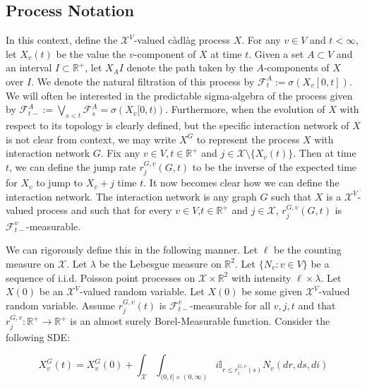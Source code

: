 \documentclass[12pt]{article}
\newcommand{\mb}{\mathbb}
\newcommand{\mc}{\mathcal}
\newcommand{\ra}{\rightarrow}
\newcommand{\ov}{\overline}
\newcommand{\ind}{\hspace{24pt}}
\newcommand{\defeq}{:=}								%
\newcommand{\sta}{\mc{X}}							%
\newcommand{\cl}[1]{\ov{#1}}						%
\newcommand{\Xf}{X}									%
\newcommand{\poiss}{N}								%
\newcommand{\leb}{\lambda}							%
\newcommand{\Sm}{\ell}								%
\newcommand{\rate}{r}								%
\newcommand{\F}{\mc{F}}								%
\newcommand{\poissv}[1]{_{#1}}						%
\newcommand{\vind}[1]{_{#1}}						%
\newcommand{\tme}[1]{(#1)}							%
\newcommand{\tmi}[1]{#1}							%
\newcommand{\gind}[1]{^{#1}}						%
\newcommand{\vpara}[1]{^{#1}}						%
\newcommand{\stpara}[1]{_{#1}}						%
\newcommand{\tpara}[1]{_{#1}}						%
\newcommand{\gvpara}[2]{^{#1,#2}}					%
\begin{document}
\subsection{Process Notation}
\label{p::not}

In this context, define the \(\sta^V\)-valued c\`adl\`ag process \(\Xf\). For any \(v \in V\) and \(t < \infty\), let \(\Xf\vind{v}\tme{t}\) be the value the \(v\)-component of \(\Xf\) at time \(t\). Given a set \(A\subset V\) and an interval \(I \subset \mb{R}^+\), let \(\Xf\vind{A}\tmi{I}\) denote the path taken by the \(A\)-components of \(\Xf\) over \(\tmi{I}\). We denote the natural filtration of this process by \(\F\vpara{A}\tpara{t} \defeq \sigma \left(\Xf\vind{v}\tmi{[0,t]}\right)\). We will often be interested in the predictable sigma-algebra of the process given by \(\F\vpara{A}\tpara{t-} \defeq \bigvee_{s < t} \F\vpara{A}\tpara{s} = \sigma\left(\Xf\vind{v}\tmi{[0,t)}\right)\). Furthermore, when the evolution of \(\Xf\) with respect to its topology is clearly defined, but the specific interaction network of \(\Xf\) is not clear from context, we may write \(\Xf\gind{G}\) to represent the process \(\Xf\) with interaction network \(G\). Fix any \(v \in V,t \in \mb{R}^+\) and \(j \in \sta\setminus\{\Xf\vind{v}\tme{t}\}\). Then at time \(t\), we can define the jump rate \(\rate\gvpara{G}{v}\stpara{j}(G,t)\) to be the inverse of the expected time for \(\Xf\vind{v}\) to jump to \(\Xf\vind{v} + j\) time \(t\). It now becomes clear how we can define the interaction network. The interaction network is any graph \(G\) such that \(\Xf\) is a \(\sta^V\)-valued process and such that for every \(v \in V\),\(t\in \mb{R}^+\) and \(j \in \sta\), \(\rate\gvpara{G}{v}\stpara{j}(G,t)\) is \(\F\vpara{v}\tpara{t-}\)-measurable. 

\ind We can rigorously define this in the following manner. Let \(\Sm\) be the counting measure on \(\sta\). Let \(\leb\) be the Lebesgue measure on \(\mb{R}^2\). Let \(\{\poiss\poissv{v}:v \in V\}\) be a sequence of i.i.d. Poisson point processes on \(\sta\times \mb{R}^2\) with intensity \(\Sm\times \leb\). Let \(\Xf\tme{0}\) be an \(\sta^V\)-valued random variable. Let \(\Xf\tme{0}\) be some given \(\sta^V\)-valued random variable. Assume \(\rate\gvpara{G}{v}\stpara{j}(t)\) is \(\F\vpara{\cl{v}}\tpara{t-}\)-measurable for all \(v,j,t\) and that \(\rate\gvpara{G}{v}\stpara{j}:\mb{R}^+ \ra\mb{R}^+\) is an almost surely Borel-Measurable function. Consider the following SDE:

\begin{equation}
\Xf\gind{G}\vind{v}\tme{t} = \Xf\gind{G}\vind{v}\tme{0} + \int_{\sta}\int_{(0,t]\times (0,\infty)} i\mb{I}_{r \leq \rate\gvpara{G}{v}\stpara{i}(s)} \poiss\poissv{v}\left(dr,ds,di\right)
\label{p::Xf}
\end{equation}
\end{document}
